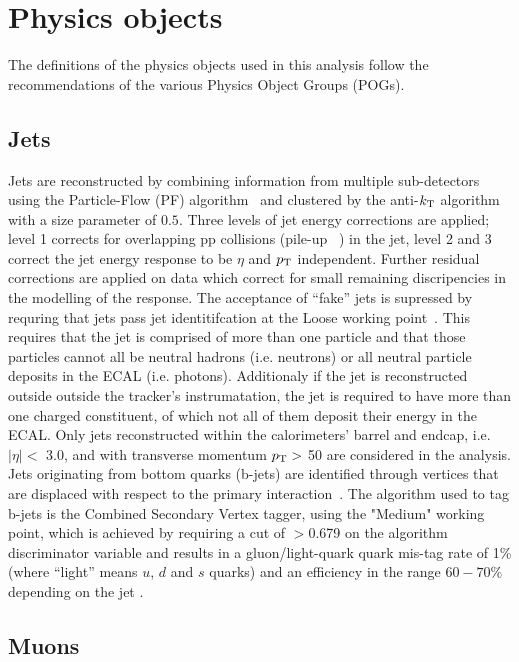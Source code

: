 \clearpage
\section{Physics objects\label{sec:reconstruction}}

The definitions of the physics objects used in this analysis follow
the recommendations of the various Physics Object Groups (POGs).

\subsection{Jets}

Jets are reconstructed by combining information from multiple
sub-detectors using the Particle-Flow (PF) algorithm~\cite{PAS-PFT-09-001} 
and clustered by the anti-$k_{\rm T}$ algorithm~\cite{antikt} with
a size parameter of $0.5$. Three levels of jet energy corrections are 
applied; level 1 corrects for overlapping pp collisions 
(pile-up ~\cite{Cacciari2008119,1126-6708-2008-04-005}) in the jet, 
level 2 and 3 correct the jet energy response to be $\eta$ and $p_{\mathrm{T}}$ independent.  
Further residual corrections are applied on data which correct for 
small remaining discripencies in the modelling of the response. The acceptance of
``fake'' jets is supressed by requring that jets pass jet identitifcation at the 
Loose working point~\cite{ref:jet-id}. This requires that the jet is comprised
of more than one particle and that those particles cannot all be neutral hadrons 
(i.e. neutrons) or all neutral particle deposits in the ECAL (i.e. photons).
Additionaly if the jet is reconstructed outside outside the tracker's 
instrumatation, the jet is required to have more than one charged 
constituent, of which not all of them deposit their energy in the ECAL. 
Only jets reconstructed within the calorimeters' barrel and endcap, 
i.e. $|\eta| <$ 3.0, and with transverse momentum $p_{\mathrm{T}} >$ 50\gev  
are considered in the analysis. Jets originating from bottom quarks 
(b-jets) are identified through vertices that are displaced with respect to the primary 
interaction~\cite{CMS-PAS-BTV-12-001}. The algorithm used to tag b-jets 
is the Combined Secondary Vertex tagger, using the "Medium" working point, 
which is achieved by requiring a cut of $>$0.679 on the algorithm discriminator 
variable and results in a gluon/light-quark quark mis-tag rate of 1\% 
(where ``light'' means $u$, $d$ and $s$ quarks) and an efficiency in the 
range $60-70\%$ depending on the jet \pt. 

\subsection{Muons}

